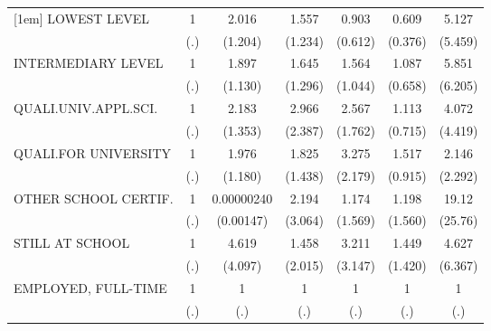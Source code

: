 {\begin{tabular}{l*{6}{c}}
[1em]
LOWEST LEVEL                  &         1         &     2.016         &     1.557         &     0.903         &     0.609         &     5.127         \\
                              &       (.)         &   (1.204)         &   (1.234)         &   (0.612)         &   (0.376)         &   (5.459)         \\
[1em]
INTERMEDIARY LEVEL            &         1         &     1.897         &     1.645         &     1.564         &     1.087         &     5.851         \\
                              &       (.)         &   (1.130)         &   (1.296)         &   (1.044)         &   (0.658)         &   (6.205)         \\
[1em]
QUALI.UNIV.APPL.SCI.          &         1         &     2.183         &     2.966         &     2.567         &     1.113         &     4.072         \\
                              &       (.)         &   (1.353)         &   (2.387)         &   (1.762)         &   (0.715)         &   (4.419)         \\
[1em]
QUALI.FOR UNIVERSITY          &         1         &     1.976         &     1.825         &     3.275         &     1.517         &     2.146         \\
                              &       (.)         &   (1.180)         &   (1.438)         &   (2.179)         &   (0.915)         &   (2.292)         \\
[1em]
OTHER SCHOOL CERTIF.          &         1         &0.00000240         &     2.194         &     1.174         &     1.198         &     19.12\sym{*}  \\
                              &       (.)         & (0.00147)         &   (3.064)         &   (1.569)         &   (1.560)         &   (25.76)         \\
[1em]
STILL AT SCHOOL               &         1         &     4.619         &     1.458         &     3.211         &     1.449         &     4.627         \\
                              &       (.)         &   (4.097)         &   (2.015)         &   (3.147)         &   (1.420)         &   (6.367)         \\
[1em]
EMPLOYED, FULL-TIME           &         1         &         1         &         1         &         1         &         1         &         1         \\
                              &       (.)         &       (.)         &       (.)         &       (.)         &       (.)         &       (.)         \\

\end{tabular}}
